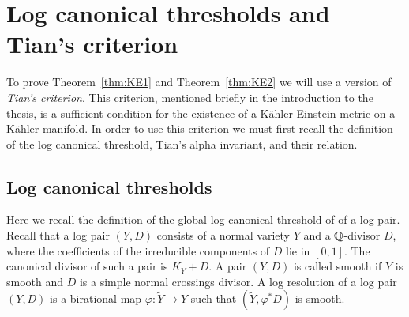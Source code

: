 \section{Log canonical thresholds and Tian's criterion}
To prove Theorem~\ref{thm:KE1} and Theorem~\ref{thm:KE2} we will use a version of \textit{Tian's criterion}. This criterion, mentioned briefly in the introduction to the thesis, is a sufficient condition for the existence of a K\"ahler-Einstein metric on a K\"ahler manifold. In order to use this criterion we must first recall the definition of the log canonical threshold, Tian's alpha invariant, and their relation.
\subsection{Log canonical thresholds}
Here we recall the definition of the global log canonical threshold of of a log pair. Recall that a log pair \((Y,D)\) consists of a normal variety \(Y\) and a \(\mathbb{Q}\)-divisor \(D\), where the coefficients of the irreducible components of \(D\) lie in \([0,1]\). The canonical divisor of such a pair is \(K_Y+D\). A pair \((Y,D)\) is called smooth if \(Y\) is smooth and \(D\) is a simple normal crossings divisor. A log resolution of a log pair \((Y,D)\) is a birational map \(\varphi: \tilde{Y} \to Y\) such that \((\tilde{Y},\varphi^*D)\) is smooth.

